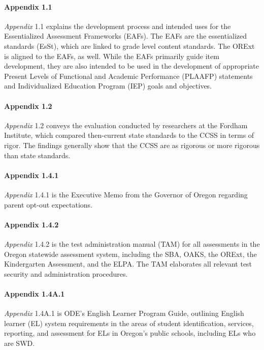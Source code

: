 \documentclass[]{article}
\let\oldparagraph\paragraph
\renewcommand{\paragraph}[1]{\oldparagraph{#1}\mbox{}}
\begin{document}
\paragraph{Appendix 1.1}\label{appendix-1.1}

\emph{Appendix} 1.1 explains the development process and intended uses
for the Essentialized Assessment Frameworks (EAFs). The EAFs are the
essentialized standards (EsSt), which are linked to grade level content
standards. The ORExt is aligned to the EAFs, as well. While the EAFs
primarily guide item development, they are also intended to be used in
the development of appropriate Present Levels of Functional and Academic
Performance (PLAAFP) statements and Individualized Education Program
(IEP) goals and objectives. \newpage

\paragraph{Appendix 1.2}\label{appendix-1.2}

\emph{Appendix} 1.2 conveys the evaluation conducted by researchers at
the Fordham Institute, which compared then-current state standards to
the CCSS in terms of rigor. The findings generally show that the CCSS
are as rigorous or more rigorous than state standards.

\paragraph{Appendix 1.4.1}\label{appendix-1.4.1}

\emph{Appendix} 1.4.1 is the Executive Memo from the Governor of Oregon
regarding parent opt-out expectations.

\paragraph{Appendix 1.4.2}\label{appendix-1.4.2}

\emph{Appendix} 1.4.2 is the test administration manual (TAM) for all
assessments in the Oregon statewide assessment system, including the
SBA, OAKS, the ORExt, the Kindergarten Assessment, and the ELPA. The TAM
elaborates all relevant test security and administration procedures.

\paragraph{Appendix 1.4A.1}\label{appendix-1.4a.1}

\emph{Appendix} 1.4A.1 is ODE's English Learner Program Guide, outlining
English learner (EL) system requirements in the areas of student
identification, services, reporting, and assessment for ELs in Oregon's
public schools, including ELs who are SWD.
\end{document}
